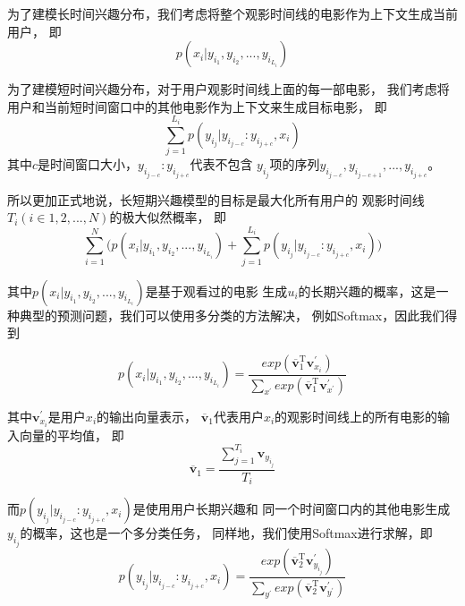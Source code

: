 为了建模长时间兴趣分布，我们考虑将整个观影时间线的电影作为上下文生成当前用户，
即
\begin{equation}
p(x_i | y_{i_1}, y_{i_2}, ..., y_{i_{L_i}})
\end{equation}

为了建模短时间兴趣分布，对于用户观影时间线上面的每一部电影，
我们考虑将用户和当前短时间窗口中的其他电影作为上下文来生成目标电影，
即
\begin{equation}
\sum_{j=1}^{L_i} p(y_{i_j} | y_{i_{j-c}} : y_{i_{j+c}}, x_i)
\end{equation}
其中$c$是时间窗口大小，$y_{i_{j-c}} : y_{i_{j+c}}$代表不包含
$y_{i_j}$项的序列$y_{i_{j-c}}, y_{i_{j-c+1}}, ..., y_{i_{j+c}}$。

所以更加正式地说，长短期兴趣模型的目标是最大化所有用户的
观影时间线$T_i(i \in 1,2,...,N)$的极大似然概率，
即
\begin{equation}
\sum_{i=1}^{N} \bigg( p(x_i | y_{i_1}, y_{i_2}, ..., y_{i_{L_i}}) +
\sum_{j=1}^{L_i} p(y_{i_j} | y_{i_{j-c}} : y_{i_{j+c}}, x_i) \bigg)
\end{equation}

其中$p(x_i | y_{i_1}, y_{i_2}, ..., y_{i_{L_i}})$是基于观看过的电影
生成$u_i$的长期兴趣的概率，这是一种典型的预测问题，我们可以使用多分类的方法解决，
例如Softmax，因此我们得到

\begin{equation}
p(x_i | y_{i_1}, y_{i_2}, ..., y_{i_{L_i}}) =
\frac
{
    exp ( \overline{\mathbf{v}}_{1}^{\mathrm{T}} \mathbf{v}_{x_i}^{'} )
}
{
    \sum_{x^{'}} exp ( \overline{\mathbf{v}}_{1}^{\mathrm{T}} \mathbf{v}_{x^{'}}^{'} )
}
\end{equation}

其中$\mathbf{v}_{x_i}^{'}$是用户$x_i$的输出向量表示，
$\overline{\mathbf{v}}_{1}$代表用户$x_i$的观影时间线上的所有电影的输入向量的平均值，
即
\begin{equation}
\overline{\mathbf{v}}_{1} = \frac{\sum_{j=1}^{T_i} \mathbf{v}_{y_{i_j}}}{T_i}
\end{equation}

而$p(y_{i_j} | y_{i_{j-c}} : y_{i_{j+c}}, x_i)$是使用用户长期兴趣和
同一个时间窗口内的其他电影生成$y_{i_j}$的概率，这也是一个多分类任务，
同样地，我们使用Softmax进行求解，即
\begin{equation}
p(y_{i_j} | y_{i_{j-c}} : y_{i_{j+c}}, x_i) =
\frac
{
    exp( \overline{\mathbf{v}}_{2}^{\mathrm{T}} \mathbf{v}_{y_{i_j}}^{'} )
}
{
    \sum_{y^{'}} exp( \overline{\mathbf{v}}_{2}^{\mathrm{T}} \mathbf{v}_{y^{'}}^{'} )
}
\end{equation}

